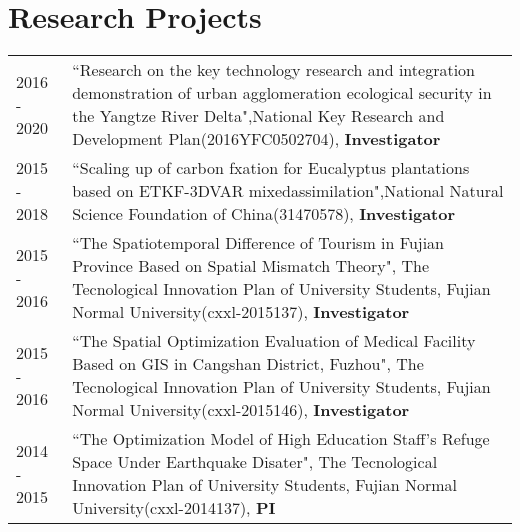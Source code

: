\section*{Research Projects}

\begin{tabular}{p{} p{}}
2016 - 2020 & ``Research on the key technology research and integration demonstration of urban agglomeration ecological security in the Yangtze River Delta",National Key Research and Development Plan(2016YFC0502704), \textbf{Investigator} \\
2015 - 2018 & ``Scaling up of carbon fxation for Eucalyptus plantations based on ETKF-3DVAR mixedassimilation",National Natural Science Foundation of China(31470578), \textbf{Investigator}\\
2015 - 2016 & ``The Spatiotemporal Difference of Tourism in Fujian Province Based on Spatial Mismatch Theory", The Tecnological Innovation Plan of University Students, Fujian Normal University(cxxl-2015137), \textbf{Investigator}\\
2015 - 2016 & ``The Spatial Optimization Evaluation of Medical Facility Based on GIS in Cangshan District, Fuzhou", The Tecnological Innovation Plan of University Students, Fujian Normal University(cxxl-2015146), \textbf{Investigator}\\
2014 - 2015 & ``The Optimization Model of High Education Staﬀ’s Refuge Space Under Earthquake Disater", The Tecnological Innovation Plan of University Students, Fujian Normal University(cxxl-2014137), \textbf{PI}\\
\end{tabular}

